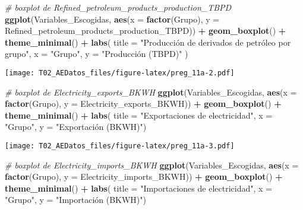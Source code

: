 \documentclass[
]{article}
\newenvironment{Shaded}{\begin{snugshade}}{\end{snugshade}}
\newcommand{\AttributeTok}[1]{\textcolor[rgb]{0.13,0.29,0.53}{#1}}
\newcommand{\CommentTok}[1]{\textcolor[rgb]{0.56,0.35,0.01}{\textit{#1}}}
\newcommand{\FunctionTok}[1]{\textcolor[rgb]{0.13,0.29,0.53}{\textbf{#1}}}
\newcommand{\NormalTok}[1]{#1}
\newcommand{\SpecialCharTok}[1]{\textcolor[rgb]{0.81,0.36,0.00}{\textbf{#1}}}
\newcommand{\StringTok}[1]{\textcolor[rgb]{0.31,0.60,0.02}{#1}}
\begin{document}
\begin{Shaded}
\begin{Highlighting}[]
\CommentTok{\# boxplot de Refined\_petroleum\_products\_production\_TBPD}
\FunctionTok{ggplot}\NormalTok{(Variables\_Escogidas, }\FunctionTok{aes}\NormalTok{(}\AttributeTok{x =} \FunctionTok{factor}\NormalTok{(Grupo), }\AttributeTok{y =}\NormalTok{ Refined\_petroleum\_products\_production\_TBPD)) }\SpecialCharTok{+}
  \FunctionTok{geom\_boxplot}\NormalTok{() }\SpecialCharTok{+}
  \FunctionTok{theme\_minimal}\NormalTok{() }\SpecialCharTok{+}
  \FunctionTok{labs}\NormalTok{(}
    \AttributeTok{title =} \StringTok{"Producción de derivados de petróleo por grupo"}\NormalTok{,}
    \AttributeTok{x =} \StringTok{"Grupo"}\NormalTok{,}
    \AttributeTok{y =} \StringTok{"Producción (TBPD)"}\NormalTok{ )}
\end{Highlighting}
\end{Shaded}

\texttt{[image: T02\_AEDatos\_files/figure-latex/preg\_11a-2.pdf]}

\begin{Shaded}
\begin{Highlighting}[]
\CommentTok{\# boxplot de Electricity\_exports\_BKWH}
\FunctionTok{ggplot}\NormalTok{(Variables\_Escogidas, }\FunctionTok{aes}\NormalTok{(}\AttributeTok{x =} \FunctionTok{factor}\NormalTok{(Grupo), }\AttributeTok{y =}\NormalTok{ Electricity\_exports\_BKWH)) }\SpecialCharTok{+}
  \FunctionTok{geom\_boxplot}\NormalTok{() }\SpecialCharTok{+}
  \FunctionTok{theme\_minimal}\NormalTok{() }\SpecialCharTok{+}
  \FunctionTok{labs}\NormalTok{(}
    \AttributeTok{title =} \StringTok{"Exportaciones de electricidad"}\NormalTok{,}
    \AttributeTok{x =} \StringTok{"Grupo"}\NormalTok{,}
    \AttributeTok{y =} \StringTok{"Exportación (BKWH)"}\NormalTok{)}
\end{Highlighting}
\end{Shaded}

\texttt{[image: T02\_AEDatos\_files/figure-latex/preg\_11a-3.pdf]}

\begin{Shaded}
\begin{Highlighting}[]
\CommentTok{\# boxplot de Electricity\_imports\_BKWH}
\FunctionTok{ggplot}\NormalTok{(Variables\_Escogidas, }\FunctionTok{aes}\NormalTok{(}\AttributeTok{x =} \FunctionTok{factor}\NormalTok{(Grupo), }\AttributeTok{y =}\NormalTok{ Electricity\_imports\_BKWH)) }\SpecialCharTok{+}
  \FunctionTok{geom\_boxplot}\NormalTok{() }\SpecialCharTok{+}
  \FunctionTok{theme\_minimal}\NormalTok{() }\SpecialCharTok{+}
  \FunctionTok{labs}\NormalTok{(}
    \AttributeTok{title =} \StringTok{"Importaciones de electricidad"}\NormalTok{,}
    \AttributeTok{x =} \StringTok{"Grupo"}\NormalTok{,}
    \AttributeTok{y =} \StringTok{"Importación (BKWH)"}\NormalTok{)}
\end{Highlighting}
\end{Shaded}
\end{document}
